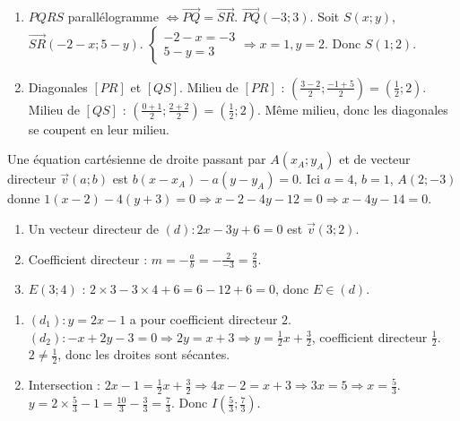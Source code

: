 \begin{enumerate}[label=\alph*)]
    \item $PQRS$ parallélogramme $\Leftrightarrow \overrightarrow{PQ} = \overrightarrow{SR}$. $\overrightarrow{PQ}(-3; 3)$. Soit $S(x; y)$, $\overrightarrow{SR}(-2 - x; 5 - y)$. $\begin{cases} -2 - x = -3 \\ 5 - y = 3 \end{cases} \Rightarrow x = 1, y = 2$. Donc $S(1; 2)$.
    \item Diagonales $[PR]$ et $[QS]$. Milieu de $[PR]$ : $\left(\frac{3-2}{2}; \frac{-1+5}{2}\right) = \left(\frac{1}{2}; 2\right)$. Milieu de $[QS]$ : $\left(\frac{0+1}{2}; \frac{2+2}{2}\right) = \left(\frac{1}{2}; 2\right)$. Même milieu, donc les diagonales se coupent en leur milieu.
\end{enumerate}

Une équation cartésienne de droite passant par $A(x_A; y_A)$ et de vecteur directeur $\vec{v}(a; b)$ est $b(x - x_A) - a(y - y_A) = 0$. Ici $a=4$, $b=1$, $A(2; -3)$ donne $1(x - 2) - 4(y + 3) = 0 \Rightarrow x - 2 - 4y - 12 = 0 \Rightarrow x - 4y - 14 = 0$.

\begin{enumerate}[label=\alph*)]
    \item Un vecteur directeur de $(d) : 2x - 3y + 6 = 0$ est $\vec{v}(3; 2)$.
    \item Coefficient directeur : $m = -\frac{a}{b} = -\frac{2}{-3} = \frac{2}{3}$.
    \item $E(3; 4)$ : $2\times3 - 3\times4 + 6 = 6 - 12 + 6 = 0$, donc $E \in (d)$.
\end{enumerate}

\begin{enumerate}[label=\alph*)]
    \item $(d_1) : y = 2x - 1$ a pour coefficient directeur $2$. $(d_2) : -x + 2y - 3 = 0 \Rightarrow 2y = x + 3 \Rightarrow y = \frac{1}{2}x + \frac{3}{2}$, coefficient directeur $\frac{1}{2}$. $2 \neq \frac{1}{2}$, donc les droites sont sécantes.
    \item Intersection : $2x - 1 = \frac{1}{2}x + \frac{3}{2} \Rightarrow 4x - 2 = x + 3 \Rightarrow 3x = 5 \Rightarrow x = \frac{5}{3}$. $y = 2\times\frac{5}{3} - 1 = \frac{10}{3} - \frac{3}{3} = \frac{7}{3}$. Donc $I\left(\frac{5}{3}; \frac{7}{3}\right)$.
\end{enumerate}

